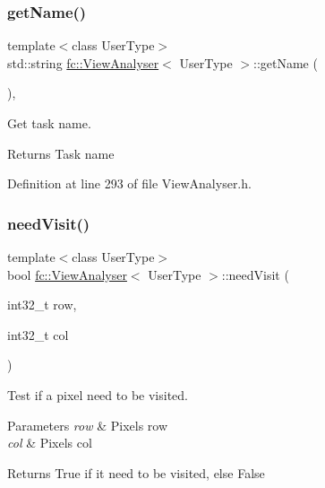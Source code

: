 \subsubsection{\texorpdfstring{get\+Name()}{getName()}}
{\footnotesize\ttfamily template$<$class User\+Type$>$ \\
std\+::string \hyperlink{classfc_1_1ViewAnalyser}{fc\+::\+View\+Analyser}$<$ User\+Type $>$\+::get\+Name (\begin{DoxyParamCaption}{ }\end{DoxyParamCaption})\hspace{0.3cm}{\ttfamily [inline]}, {\ttfamily [override]}}



Get task name. 

\begin{DoxyReturn}{Returns}
Task name 
\end{DoxyReturn}


Definition at line 293 of file View\+Analyser.\+h.

\mbox{\label{classfc_1_1ViewAnalyser_a3e64703fb8f40d4bb4953be268f1afb9}} 
\subsubsection{\texorpdfstring{need\+Visit()}{needVisit()}}
{\footnotesize\ttfamily template$<$class User\+Type$>$ \\
bool \hyperlink{classfc_1_1ViewAnalyser}{fc\+::\+View\+Analyser}$<$ User\+Type $>$\+::need\+Visit (\begin{DoxyParamCaption}\item[{int32\+\_\+t}]{row,  }\item[{int32\+\_\+t}]{col }\end{DoxyParamCaption})\hspace{0.3cm}{\ttfamily [inline]}}



Test if a pixel need to be visited. 


\begin{DoxyParams}{Parameters}
{\em row} & Pixel\textquotesingle{}s row \\
\hline
{\em col} & Pixel\textquotesingle{}s col \\
\hline
\end{DoxyParams}
\begin{DoxyReturn}{Returns}
True if it need to be visited, else False 
\end{DoxyReturn}


